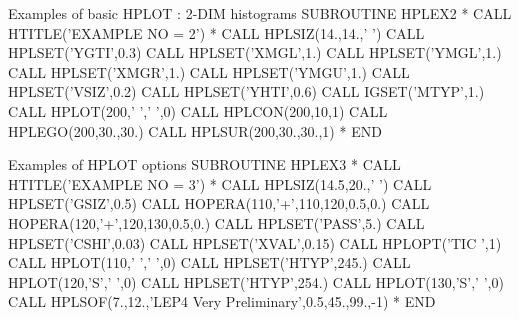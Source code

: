 \newpage

\begin{XMPt}{Examples of basic HPLOT : 2-DIM histograms}
      SUBROUTINE HPLEX2
*
      CALL HTITLE('EXAMPLE NO = 2')
*
      CALL HPLSIZ(14.,14.,' ')
      CALL HPLSET('YGTI',0.3)
      CALL HPLSET('XMGL',1.)
      CALL HPLSET('YMGL',1.)
      CALL HPLSET('XMGR',1.)
      CALL HPLSET('YMGU',1.)
      CALL HPLSET('VSIZ',0.2)
      CALL HPLSET('YHTI',0.6)
      CALL IGSET('MTYP',1.)
      CALL HPLOT(200,' ',' ',0)
      CALL HPLCON(200,10,1)
      CALL HPLEGO(200,30.,30.)
      CALL HPLSUR(200,30.,30.,1)
*
      END
\end{XMPt}
\newpage
\begin{Fighere}
\begin{center}\mbox{}\end{center}
\end{Fighere}
\begin{Fighere}
\begin{center}\mbox{}\end{center}
\end{Fighere}
\begin{Fighere}
\begin{center}\mbox{}\end{center}
\end{Fighere}
\begin{Fighere}
\begin{center}\mbox{}\end{center}
\end{Fighere}

\newpage

\begin{XMPt}{Examples of HPLOT options}
      SUBROUTINE HPLEX3
*
      CALL HTITLE('EXAMPLE NO = 3')
*
      CALL HPLSIZ(14.5,20.,' ')
      CALL HPLSET('GSIZ',0.5)
      CALL HOPERA(110,'+',110,120,0.5,0.)
      CALL HOPERA(120,'+',120,130,0.5,0.)
      CALL HPLSET('PASS',5.)
      CALL HPLSET('CSHI',0.03)
      CALL HPLSET('XVAL',0.15)
      CALL HPLOPT('TIC ',1)
      CALL HPLOT(110,' ',' ',0)
      CALL HPLSET('HTYP',245.)
      CALL HPLOT(120,'S',' ',0)
      CALL HPLSET('HTYP',254.)
      CALL HPLOT(130,'S',' ',0)
      CALL HPLSOF(7.,12.,'LEP4 Very Preliminary',0.5,45.,99.,-1)
*
      END
\end{XMPt}
\newpage
\begin{Fighere}
\begin{center}\mbox{}\end{center}
\end{Fighere}


